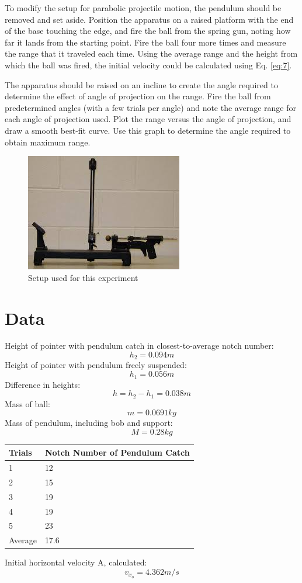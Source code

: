 \documentclass[11pt, titlepage]{article}
\begin{document}
To modify the setup for parabolic projectile motion, the pendulum should be removed and set aside. Position the apparatus on a raised platform with the end of the base touching the edge, and fire the ball from the spring gun, noting how far it lands from the starting point. Fire the ball four more times and measure the range that it traveled each time. Using the average range and the height from which the ball was fired, the initial velocity could be calculated using Eq. \ref{eq:7}.

The apparatus should be raised on an incline to create the angle required to determine the effect of angle of projection on the range. Fire the ball from predetermined angles (with a few trials per angle) and note the average range for each angle of projection used. Plot the range versus the angle of projection, and draw a smooth best-fit curve. Use this graph to determine the angle required to obtain maximum range.
\begin{figure}[!ht]
\centering
\includegraphics[scale=1.5, angle=0]{lab2.jpg}
\caption{Setup used for this experiment \label{fig:setup}}
\end{figure}

\pagebreak
\section*{Data}
Height of pointer with pendulum catch in closest-to-average notch number:
$$h_2 = 0.094 m$$
Height of pointer with pendulum freely suspended:
$$ h_1 = 0.056 m$$
Difference in heights:
$$h = h_2 - h_1 = 0.038 m$$
Mass of ball:
$$m = 0.0691 kg$$
Mass of pendulum, including bob and support:
$$M = 0.28 kg$$
\begin{center}
\begin{tabular}
{|m{7em}|m{7em}|}
\hline
Trials & Notch Number of Pendulum Catch \\
\hline
1 & 12\\
\hline
2 & 15\\
\hline
3 & 19\\
\hline
4 & 19\\
\hline
5 & 23\\
\hline
Average & 17.6\\
\hline
\end{tabular}
\end{center}
Initial horizontal velocity A, calculated:
$$v_{x_o} = 4.362 m/s$$
\end{document}
